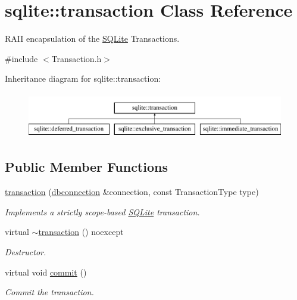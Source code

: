 \hypertarget{a00014}{\section{sqlite\-:\-:transaction Class Reference}
\label{a00014}
}


R\-A\-I\-I encapsulation of the \hyperlink{a00038}{S\-Q\-Lite} Transactions.  




{\ttfamily \#include $<$Transaction.\-h$>$}

Inheritance diagram for sqlite\-:\-:transaction\-:\begin{figure}[H]
\begin{center}
\leavevmode
\includegraphics[height=2.000000cm]{a00014}
\end{center}
\end{figure}
\subsection*{Public Member Functions}
\begin{DoxyCompactItemize}
\item 
\hyperlink{a00014_ac5e2efbcd15f1531c00cbcacfa74c3f0}{transaction} (\hyperlink{a00004}{dbconnection} \&connection, const Transaction\-Type type)
\begin{DoxyCompactList}\small\item\em Implements a strictly scope-\/based \hyperlink{a00038}{S\-Q\-Lite} transaction. \end{DoxyCompactList}\item 
virtual \hyperlink{a00014_a798101cf276674d19708c1958e5b03fb}{$\sim$transaction} () noexcept
\begin{DoxyCompactList}\small\item\em Destructor. \end{DoxyCompactList}\item 
\hypertarget{a00014_abe219dd0bf949d569381f9830c7b2d1a}{virtual void \hyperlink{a00014_abe219dd0bf949d569381f9830c7b2d1a}{commit} ()}\label{a00014_abe219dd0bf949d569381f9830c7b2d1a}

\begin{DoxyCompactList}\small\item\em Commit the transaction. \end{DoxyCompactList}\end{DoxyCompactItemize}


